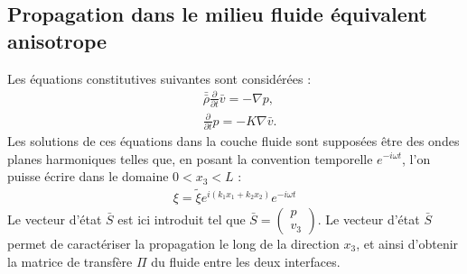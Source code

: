 \documentclass[twoside,openright]{report}
\begin{document}
\subsection{Propagation dans le milieu fluide équivalent anisotrope}
\label{Ch_Prop_S_Pb_SS_Eul}
    Les équations constitutives suivantes sont considérées :
    \begin{align}
	&\bar{\bar{\rho}} \frac{\partial}{\partial t}\bar{v}=-\nabla p,\label{Const1} \\
	&\frac{\partial}{\partial t}p=-K\nabla \bar{v}.\label{Const2}
    \end{align}
    Les solutions de ces équations dans la couche fluide sont supposées être  des ondes planes harmoniques telles que, en posant la convention temporelle $e^{-i\omega t}$, l'on puisse écrire dans le domaine $0<x_3<L$ :
    \begin{align}
        \xi=\tilde{\xi}e^{i(k_1 x_1+k_2 x_2)}e^{-i\omega t}\label{Convention_k_t}
    \end{align}
    Le vecteur d'état $\bar{S}$ est ici introduit tel que $\bar{S}=\begin{pmatrix} p \\ v_3 \end{pmatrix}$. Le vecteur d'état $\bar{S}$ permet de caractériser la propagation le long de la direction $x_3$, et ainsi d'obtenir la matrice de transfère $\Pi$ du fluide entre les deux interfaces.
    
\end{document}
